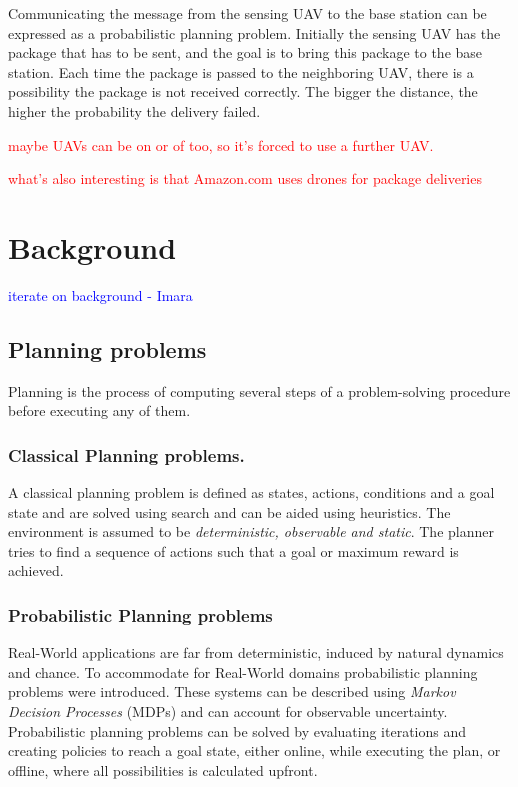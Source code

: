 \documentclass[runningheads,a4paper]{llncs}
\newcommand\myworries[1]{\textcolor{red}{#1}}
\newcommand\todo[1]{\textcolor{blue}{#1}}
\begin{document}
Communicating the message from the sensing UAV to the base station can be
expressed as a probabilistic planning problem. Initially the sensing UAV
has the package that has to be sent, and the goal is to bring this package to
the base station. Each time the package is passed to the neighboring UAV,
there is a possibility the package is not received correctly. The bigger the
distance, the higher the probability the delivery failed.

\myworries{maybe UAVs can be on or of too, so it's forced to use a further UAV.}

\myworries{what's also interesting is that Amazon.com uses drones for package deliveries}


\section{Background}
\label{sec:background}

\todo{iterate on background - Imara}
\subsection{Planning problems}

Planning is the process of computing several steps of a problem-solving procedure before executing any of them.

\subsubsection{Classical Planning problems.}

A classical planning problem is defined as states, actions, conditions and a goal state and are solved using search and can be aided using heuristics. The environment is assumed to be \emph{deterministic, observable and static}. The planner tries to find a sequence of actions such that a goal or maximum reward is achieved.

\subsubsection{Probabilistic Planning problems}

Real-World applications are far from deterministic, induced by natural dynamics and chance. To accommodate for Real-World domains probabilistic planning problems were introduced.  These systems can be described using \emph{Markov Decision Processes} (MDPs) and can account for observable uncertainty. Probabilistic planning problems can be solved by evaluating iterations and creating policies to reach a goal state, either online, while executing the plan, or offline, where all possibilities is calculated upfront.
\end{document}
